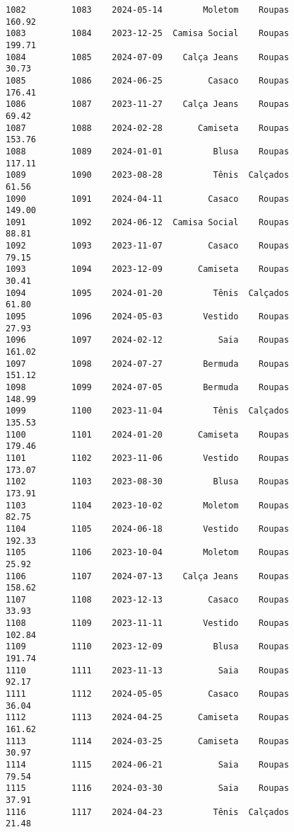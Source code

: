 \documentclass[11pt]{article}
\begin{document}
\begin{Verbatim}[commandchars=\\\{\}]
1082         1083    2024-05-14        Moletom    Roupas          160.92   
1083         1084    2023-12-25  Camisa Social    Roupas          199.71   
1084         1085    2024-07-09    Calça Jeans    Roupas           30.73   
1085         1086    2024-06-25         Casaco    Roupas          176.41   
1086         1087    2023-11-27    Calça Jeans    Roupas           69.42   
1087         1088    2024-02-28       Camiseta    Roupas          153.76   
1088         1089    2024-01-01          Blusa    Roupas          117.11   
1089         1090    2023-08-28          Tênis  Calçados           61.56   
1090         1091    2024-04-11         Casaco    Roupas          149.00   
1091         1092    2024-06-12  Camisa Social    Roupas           88.81   
1092         1093    2023-11-07         Casaco    Roupas           79.15   
1093         1094    2023-12-09       Camiseta    Roupas           30.41   
1094         1095    2024-01-20          Tênis  Calçados           61.80   
1095         1096    2024-05-03        Vestido    Roupas           27.93   
1096         1097    2024-02-12           Saia    Roupas          161.02   
1097         1098    2024-07-27        Bermuda    Roupas          151.12   
1098         1099    2024-07-05        Bermuda    Roupas          148.99   
1099         1100    2023-11-04          Tênis  Calçados          135.53   
1100         1101    2024-01-20       Camiseta    Roupas          179.46   
1101         1102    2023-11-06        Vestido    Roupas          173.07   
1102         1103    2023-08-30          Blusa    Roupas          173.91   
1103         1104    2023-10-02        Moletom    Roupas           82.75   
1104         1105    2024-06-18        Vestido    Roupas          192.33   
1105         1106    2023-10-04        Moletom    Roupas           25.92   
1106         1107    2024-07-13    Calça Jeans    Roupas          158.62   
1107         1108    2023-12-13         Casaco    Roupas           33.93   
1108         1109    2023-11-11        Vestido    Roupas          102.84   
1109         1110    2023-12-09          Blusa    Roupas          191.74   
1110         1111    2023-11-13           Saia    Roupas           92.17   
1111         1112    2024-05-05         Casaco    Roupas           36.04   
1112         1113    2024-04-25       Camiseta    Roupas          161.62   
1113         1114    2024-03-25       Camiseta    Roupas           30.97   
1114         1115    2024-06-21           Saia    Roupas           79.54   
1115         1116    2024-03-30           Saia    Roupas           37.91   
1116         1117    2024-04-23          Tênis  Calçados           21.48   

\end{Verbatim}
\end{document}
